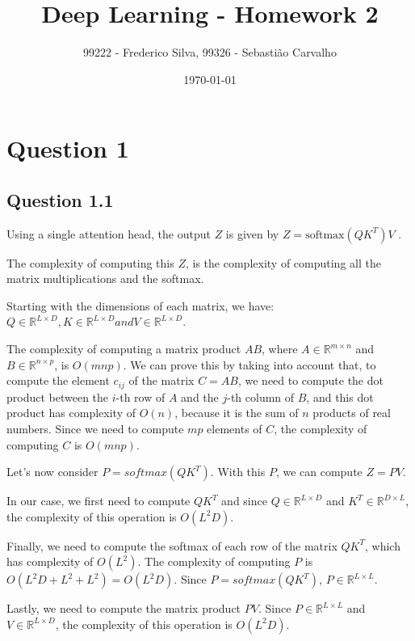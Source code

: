 \documentclass{article}
\title{Deep Learning - Homework 2}
\author{99222 - Frederico Silva, 99326 - Sebastião Carvalho}
\date{\today}
\begin{document}
\maketitle

\tableofcontents

\section{Question 1}

\subsection{Question 1.1}

Using a single attention head, the output $Z$ is given by $Z = \text{softmax} \left(QK^T\right) V$ .

The complexity of computing this $Z$, is the complexity of computing all the matrix multiplications and the softmax.

Starting with the dimensions of each matrix, we have:
$
    Q \in \mathbb{R}^{L \times D}, K \in \mathbb{R}^{L \times D} and V \in \mathbb{R}^{L \times D}.
$

\bigskip

The complexity of computing a matrix product $AB$, where $A \in \mathbb{R}^{m \times n}$ and $B \in \mathbb{R}^{n \times p}$, is $O(mnp)$.
We can prove this by taking into account that, to compute the element $c_{ij}$ of the matrix $C = AB$, we need to compute the dot product between the $i$-th row of 
$A$ and the $j$-th column of $B$, and this dot product has complexity of $O(n)$, because it is the sum of $n$ products of real numbers.
Since we need to compute $mp$ elements of $C$, the complexity of computing $C$ is $O(mnp)$.

\bigskip

Let's now consider $P = softmax \left(QK^T\right)$. With this $P$, we can compute $Z = PV$.

In our case, we first need to compute $QK^T$ and since $Q \in \mathbb{R}^{L \times D}$ and $K^T \in \mathbb{R}^{D \times L}$, 
the complexity of this operation is $O(L^2D)$.

Finally, we need to compute the softmax of each row of the matrix $QK^T$, which has complexity of $O(L^2)$.
The complexity of computing $P$ is $O(L^2D + L^2 + L^2) = O(L^2D)$. 
Since $P = softmax \left(QK^T\right)$, $P \in \mathbb{R}^{L \times L}$.

\bigskip

Lastly, we need to compute the matrix product $PV$. Since $P \in \mathbb{R}^{L \times L}$ and $V \in \mathbb{R}^{L \times D}$,
the complexity of this operation is $O(L^2D)$.
\end{document}
